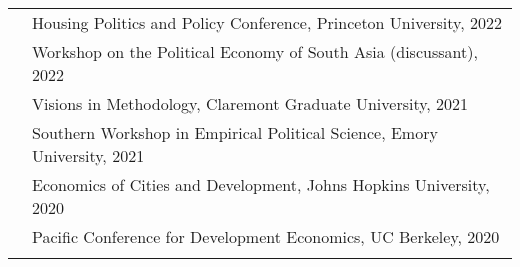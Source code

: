 \documentclass[letterpaper, 10.5pt]{article}
\begin{document}
\begin{longtable}{p{1.5in}p{5in}}
           &Housing Politics and Policy Conference, Princeton University, 2022\\
 & Workshop on the Political Economy of South Asia (discussant), 2022\\        



  & Visions in Methodology, Claremont Graduate University, 2021 \\
  
    &Southern Workshop in Empirical Political Science, Emory University, 2021 \\
 

 & Economics of Cities and Development, Johns Hopkins University, 2020\\
 & Pacific Conference for Development Economics, UC Berkeley, 2020 \\
 &\\


% 
 

\end{longtable}
\end{document}
